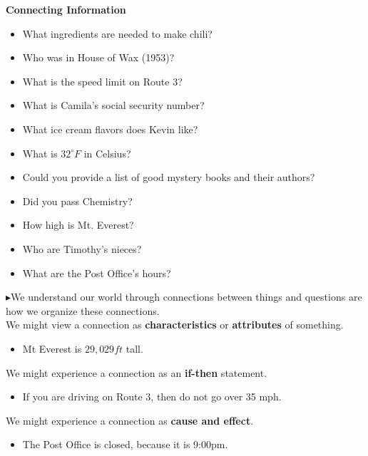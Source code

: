 \documentclass{ximera}
\begin{document}
\begin{observation} \textbf{\textcolor{blue!75!black}{Connecting Information}}  

\begin{itemize} 
\item What ingredients are needed to make chili?
\item Who was in House of Wax (1953)?
\item What is the speed limit on Route 3?
\item What is Camila's social security number?
\item What ice cream flavors does Kevin like?
\item What is $32^\circ F$ in Celsius?
\item Could you provide a list of good mystery books and their authors?
\item Did you pass Chemistry?
\item How high is Mt. Everest?
\item Who are Timothy's nieces?
\item What are the Post Office's hours?
\end{itemize}

$\blacktriangleright$We understand our world through connections between things and questions are how we organize these connections. \\


We might view a connection as \textbf{\textcolor{purple!85!blue}{characteristics}} or \textbf{\textcolor{purple!85!blue}{attributes}} of something. 
\begin{itemize}
\item Mt Everest is $29,029 ft$ tall.
\end{itemize}


We might experience a connection as an \textbf{\textcolor{purple!85!blue}{if-then}} statement.
\begin{itemize}
\item If you are driving on Route 3, then do not go over 35 mph.
\end{itemize}



We might experience a connection as \textbf{\textcolor{purple!85!blue}{cause and effect}}.
\begin{itemize}
\item The Post Office is closed, because it is 9:00pm.
\end{itemize}

\end{observation}
\end{document}
